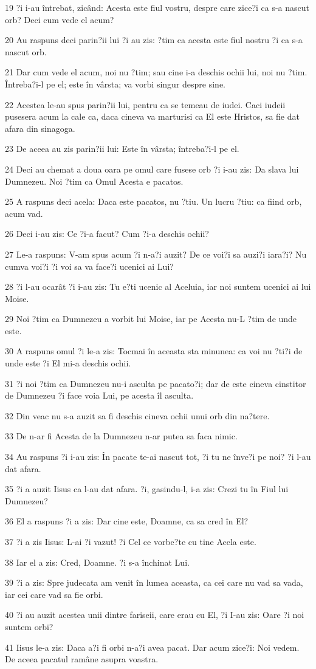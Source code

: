 \par 19 ?i i-au întrebat, zicând: Acesta este fiul vostru, despre care zice?i ca s-a nascut orb? Deci cum vede el acum?
\par 20 Au raspuns deci parin?ii lui ?i au zis: ?tim ca acesta este fiul nostru ?i ca s-a nascut orb.
\par 21 Dar cum vede el acum, noi nu ?tim; sau cine i-a deschis ochii lui, noi nu ?tim. Întreba?i-l pe el; este în vârsta; va vorbi singur despre sine.
\par 22 Acestea le-au spus parin?ii lui, pentru ca se temeau de iudei. Caci iudeii pusesera acum la cale ca, daca cineva va marturisi ca El este Hristos, sa fie dat afara din sinagoga.
\par 23 De aceea au zis parin?ii lui: Este în vârsta; întreba?i-l pe el.
\par 24 Deci au chemat a doua oara pe omul care fusese orb ?i i-au zis: Da slava lui Dumnezeu. Noi ?tim ca Omul Acesta e pacatos.
\par 25 A raspuns deci acela: Daca este pacatos, nu ?tiu. Un lucru ?tiu: ca fiind orb, acum vad.
\par 26 Deci i-au zis: Ce ?i-a facut? Cum ?i-a deschis ochii?
\par 27 Le-a raspuns: V-am spus acum ?i n-a?i auzit? De ce voi?i sa auzi?i iara?i? Nu cumva voi?i ?i voi sa va face?i ucenici ai Lui?
\par 28 ?i l-au ocarât ?i i-au zis: Tu e?ti ucenic al Aceluia, iar noi suntem ucenici ai lui Moise.
\par 29 Noi ?tim ca Dumnezeu a vorbit lui Moise, iar pe Acesta nu-L ?tim de unde este.
\par 30 A raspuns omul ?i le-a zis: Tocmai în aceasta sta minunea: ca voi nu ?ti?i de unde este ?i El mi-a deschis ochii.
\par 31 ?i noi ?tim ca Dumnezeu nu-i asculta pe pacato?i; dar de este cineva cinstitor de Dumnezeu ?i face voia Lui, pe acesta îl asculta.
\par 32 Din veac nu s-a auzit sa fi deschis cineva ochii unui orb din na?tere.
\par 33 De n-ar fi Acesta de la Dumnezeu n-ar putea sa faca nimic.
\par 34 Au raspuns ?i i-au zis: În pacate te-ai nascut tot, ?i tu ne înve?i pe noi? ?i l-au dat afara.
\par 35 ?i a auzit Iisus ca l-au dat afara. ?i, gasindu-l, i-a zis: Crezi tu în Fiul lui Dumnezeu?
\par 36 El a raspuns ?i a zis: Dar cine este, Doamne, ca sa cred în El?
\par 37 ?i a zis Iisus: L-ai ?i vazut! ?i Cel ce vorbe?te cu tine Acela este.
\par 38 Iar el a zis: Cred, Doamne. ?i s-a închinat Lui.
\par 39 ?i a zis: Spre judecata am venit în lumea aceasta, ca cei care nu vad sa vada, iar cei care vad sa fie orbi.
\par 40 ?i au auzit acestea unii dintre fariseii, care erau cu El, ?i I-au zis: Oare ?i noi suntem orbi?
\par 41 Iisus le-a zis: Daca a?i fi orbi n-a?i avea pacat. Dar acum zice?i: Noi vedem. De aceea pacatul ramâne asupra voastra.

